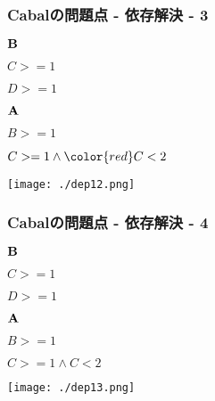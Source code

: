 \documentclass[cjk,dvipdfm,14pt]{beamer}
\begin{document}
\begin{frame}
\frametitle{Cabalの問題点 - 依存解決 - 3}

\begin{description}
\item ${\bf B}$
\item
  \begin{description}
  \item $C >= 1$
  \item $D >= 1$
  \end{description}
\end{description}

\begin{description}
\item ${\bf A}$
\item
  \begin{description}
  \item $B >= 1$
  \item $C >= 1 \wedge {\color{red} C < 2}$
  \end{description}
\end{description}

\texttt{[image: ./dep12.png]}
\end{frame}

\begin{frame}
\frametitle{Cabalの問題点 - 依存解決 - 4}

\begin{description}
\item ${\bf B}$
\item
  \begin{description}
  \item $C >= 1$
  \item $D >= 1$
  \end{description}
\end{description}

\begin{description}
\item ${\bf A}$
\item
  \begin{description}
  \item $B >= 1$
  \item $C >= 1 \wedge C < 2$
  \end{description}
\end{description}

\texttt{[image: ./dep13.png]}
\end{frame}
\end{document}
